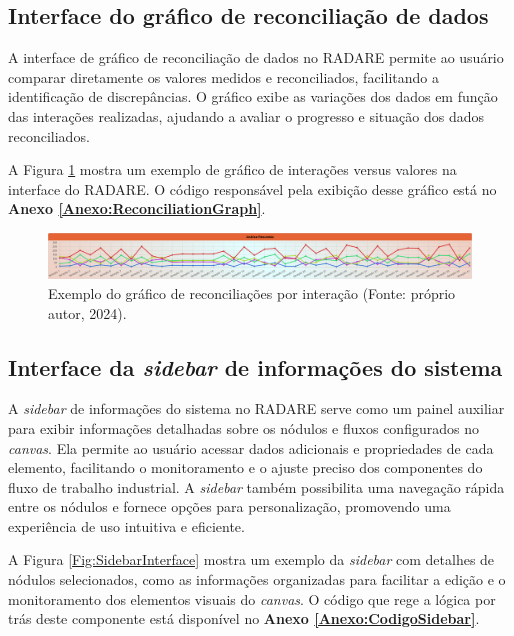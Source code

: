\subsection{Interface do gráfico de reconciliação de dados}

A interface de gráfico de reconciliação de dados no RADARE permite ao usuário comparar diretamente os valores medidos e reconciliados, facilitando a identificação de discrepâncias. O gráfico exibe as variações dos dados em função das interações realizadas, ajudando a avaliar o progresso e situação dos dados reconciliados.

A Figura \ref{Fig:ReconciliationGraph} mostra um exemplo de gráfico de interações versus valores na interface do RADARE. O código responsável pela exibição desse gráfico está no \textbf{Anexo \ref{Anexo:ReconciliationGraph}}.

\begin{figure}[htbp]
    \centering
    \includegraphics[width=1\textwidth]{figuras/interface-grafico.png}
    \caption{Exemplo do gráfico de reconciliações por interação (Fonte: próprio autor, 2024).}
    \label{Fig:ReconciliationGraph}
\end{figure}

\subsection{Interface da \textit{sidebar} de informações do sistema}

A \textit{sidebar} de informações do sistema no RADARE serve como um painel auxiliar para exibir informações detalhadas sobre os nódulos e fluxos configurados no \textit{canvas}. Ela permite ao usuário acessar dados adicionais e propriedades de cada elemento, facilitando o monitoramento e o ajuste preciso dos componentes do fluxo de trabalho industrial. A \textit{sidebar} também possibilita uma navegação rápida entre os nódulos e fornece opções para personalização, promovendo uma experiência de uso intuitiva e eficiente.

A Figura \ref{Fig:SidebarInterface} mostra um exemplo da \textit{sidebar} com detalhes de nódulos selecionados, como as informações organizadas para facilitar a edição e o monitoramento dos elementos visuais do \textit{canvas}. O código que rege a lógica por trás deste componente está disponível no \textbf{Anexo \ref{Anexo:CodigoSidebar}}.


